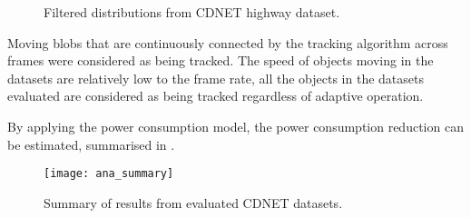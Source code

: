 \begin{figure}[htb]
  \centering
  \caption{Filtered distributions from CDNET highway dataset.}
  \label{ana:ada}
\end{figure}

Moving blobs that are continuously connected by the tracking algorithm across frames were considered as being tracked. The speed of objects moving in the datasets are relatively low to the frame rate, all the objects in the datasets evaluated are considered as being tracked regardless of adaptive operation.

By applying the power consumption model, the power consumption reduction can be estimated, summarised in .

\begin{figure}[htb]
  \centering
  \texttt{[image: ana\_summary]}
  \caption{Summary of results from evaluated CDNET datasets.}
  \label{ana:summary}
\end{figure}
